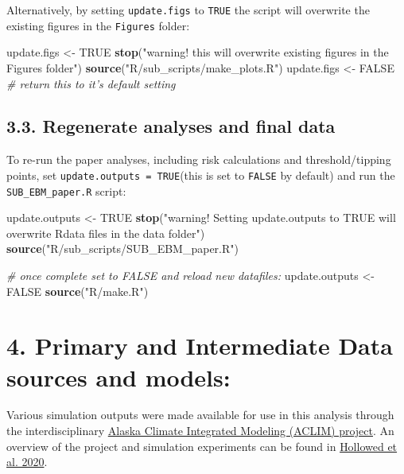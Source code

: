 \documentclass[]{article}
\newenvironment{Shaded}{\begin{snugshade}}{\end{snugshade}}
\newcommand{\KeywordTok}[1]{\textcolor[rgb]{0.13,0.29,0.53}{\textbf{{#1}}}}
\newcommand{\StringTok}[1]{\textcolor[rgb]{0.31,0.60,0.02}{{#1}}}
\newcommand{\CommentTok}[1]{\textcolor[rgb]{0.56,0.35,0.01}{\textit{{#1}}}}
\newcommand{\OtherTok}[1]{\textcolor[rgb]{0.56,0.35,0.01}{{#1}}}
\newcommand{\NormalTok}[1]{{#1}}
\begin{document}
Alternatively, by setting \texttt{update.figs} to \texttt{TRUE} the
script will overwrite the existing figures in the \texttt{Figures}
folder:

\begin{Shaded}
\begin{Highlighting}[]
    \NormalTok{update.figs  <-}\StringTok{ }\OtherTok{TRUE}  
    \KeywordTok{stop}\NormalTok{(}\StringTok{"warning! this will overwrite existing figures in the Figures folder"}\NormalTok{)}
    \KeywordTok{source}\NormalTok{(}\StringTok{"R/sub_scripts/make_plots.R"}\NormalTok{)}
    \NormalTok{update.figs  <-}\StringTok{ }\OtherTok{FALSE}   \CommentTok{# return this to it's default setting}
\end{Highlighting}
\end{Shaded}

\subsection{3.3. Regenerate analyses and final
data}\label{regenerate-analyses-and-final-data}

To re-run the paper analyses, including risk calculations and
threshold/tipping points, set \texttt{update.outputs\ =\ TRUE}(this is
set to \texttt{FALSE} by default) and run the \texttt{SUB\_EBM\_paper.R}
script:

\begin{Shaded}
\begin{Highlighting}[]
    \NormalTok{update.outputs  <-}\StringTok{ }\OtherTok{TRUE}  
    \KeywordTok{stop}\NormalTok{(}\StringTok{"warning! Setting update.outputs to TRUE will overwrite Rdata files in the data folder"}\NormalTok{)}
    \KeywordTok{source}\NormalTok{(}\StringTok{"R/sub_scripts/SUB_EBM_paper.R"}\NormalTok{)}

    \CommentTok{# once complete set to FALSE and reload new datafiles:}
    \NormalTok{update.outputs  <-}\StringTok{ }\OtherTok{FALSE}  
    \KeywordTok{source}\NormalTok{(}\StringTok{"R/make.R"}\NormalTok{)}
\end{Highlighting}
\end{Shaded}

\section{4. Primary and Intermediate Data sources and
models:}\label{primary-and-intermediate-data-sources-and-models}

Various simulation outputs were made available for use in this analysis
through the interdisciplinary
\href{\%22https://www.fisheries.noaa.gov/alaska/ecosystems/alaska-climate-integrated-modeling-project\%22}{Alaska
Climate Integrated Modeling (ACLIM) project}. An overview of the project
and simulation experiments can be found in
\href{\%22https://www.frontiersin.org/articles/10.3389/fmars.2019.00775/full\%22}{Hollowed
et al. 2020}.
\end{document}
